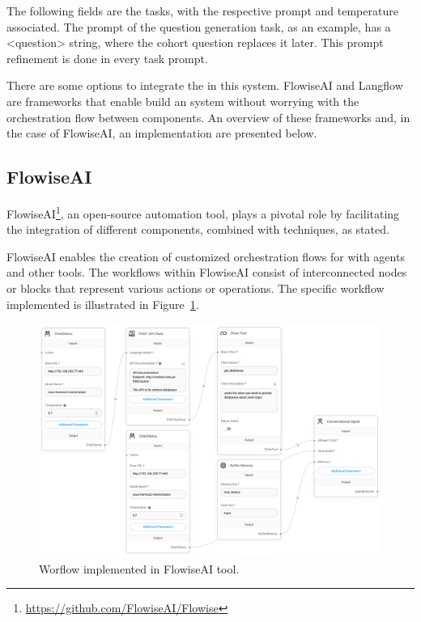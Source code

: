 The following fields are the tasks, with the respective prompt and temperature associated. The prompt of the question generation task, as an example, has a <question> string, where the cohort question replaces it later. This prompt refinement is done in every task prompt.





There are some options to integrate the {\llm} in this system. FlowiseAI and Langflow are frameworks that enable build an {\llm} system without worrying with the orchestration flow between components. An overview of these frameworks and, in the case of FlowiseAI, an implementation are presented below.



\subsection{FlowiseAI}
\label{flowise}

FlowiseAI\footnote{\url{https://github.com/FlowiseAI/Flowise}}, an open-source automation tool, plays a pivotal role by facilitating the integration of different {\ai} components, combined with {\ir} techniques, as \citet{reis2024flowise} stated.

FlowiseAI enables the creation of customized orchestration flows for {\llm} with {\ai} agents and other tools. The workflows within FlowiseAI consist of interconnected nodes or blocks that represent various actions or operations. The specific workflow implemented is illustrated in Figure~\ref{fig_workflow}.


\begin{figure}[H]
    \includegraphics[width=\textwidth]{figs/chapter3/workflow.png}
    \centering
    \caption{Worflow implemented in FlowiseAI tool.}
    \label{fig_workflow}
\end{figure}


